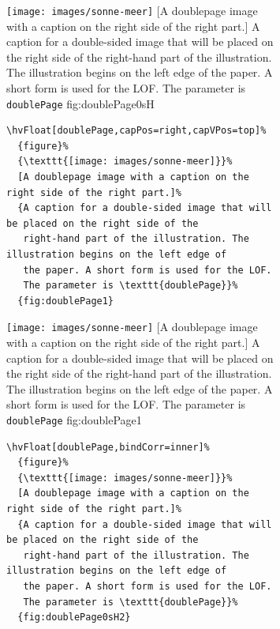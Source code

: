 \documentclass[twoside,paper=a4,usegeometry]{scrartcl}
\makeatletter
\let\hvBlindtext\Blindtext
\def\Blindtext{\par\color{black!40}\hvBlindtext\par\normalcolor}
\def\hvblindtext{\textcolor{black!40}{\blindtext@text}}
\makeatother
\begin{document}
\begin{figure}[p]
\begin{figure}[p]
\hvFloatSetDefaults

%
  {\texttt{[image: images/sonne-meer]}}%
  [A doublepage image with a caption on the right side of the right part.]%
  {A caption for a double-sided image that will be placed on the right side of the
   right-hand part of the illustration. The illustration begins on the left edge of 
   the paper. A short form is used for the LOF. 
   The parameter is \texttt{doublePage}}%
  {fig:doublePage0sH}

\Blindtext

\Blindtext

\hvblindtext

\Blindtext

\hvblindtext


\begin{lstlisting}
\hvFloat[doublePage,capPos=right,capVPos=top]%
  {figure}%
  {\texttt{[image: images/sonne-meer]}}%
  [A doublepage image with a caption on the right side of the right part.]%
  {A caption for a double-sided image that will be placed on the right side of the
   right-hand part of the illustration. The illustration begins on the left edge of 
   the paper. A short form is used for the LOF. 
   The parameter is \texttt{doublePage}}%
  {fig:doublePage1}
\end{lstlisting}


\hvFloatSetDefaults

%
  {\texttt{[image: images/sonne-meer]}}%
  [A doublepage image with a caption on the right side of the right part.]%
  {A caption for a double-sided image that will be placed on the right side of the
   right-hand part of the illustration. The illustration begins on the left edge of 
   the paper. A short form is used for the LOF. 
   The parameter is \texttt{doublePage}}%
  {fig:doublePage1}

\Blindtext

\Blindtext

\Blindtext

\Blindtext




\begin{lstlisting}
\hvFloat[doublePage,bindCorr=inner]%
  {figure}%
  {\texttt{[image: images/sonne-meer]}}%
  [A doublepage image with a caption on the right side of the right part.]%
  {A caption for a double-sided image that will be placed on the right side of the
   right-hand part of the illustration. The illustration begins on the left edge of 
   the paper. A short form is used for the LOF. 
   The parameter is \texttt{doublePage}}%
  {fig:doublePage0sH2}
\end{lstlisting}



\end{figure}
\end{figure}
\end{document}

